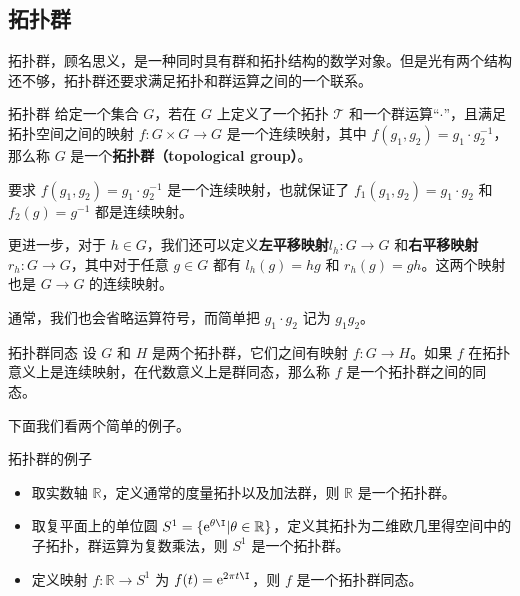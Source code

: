 


\subsection{拓扑群}
拓扑群，顾名思义，是一种同时具有群和拓扑结构的数学对象。但是光有两个结构还不够，拓扑群还要求满足拓扑和群运算之间的一个联系。

\begin{definition}{拓扑群}\label{def_TopGrp_1}
给定一个集合 $G$，若在 $G$ 上定义了一个拓扑 $\mathcal{T}$ 和一个群运算“$\cdot$”，且满足拓扑空间之间的映射 $f:G\times G\rightarrow G$ 是一个连续映射，其中 $f(g_1, g_2)=g_1\cdot g_2^{-1}$，那么称 $G$ 是一个\textbf{拓扑群（topological group）}。
\end{definition}

要求 $f(g_1, g_2)=g_1\cdot g_2^{-1}$ 是一个连续映射，也就保证了 $f_1(g_1, g_2)=g_1\cdot g_2$ 和 $f_2(g)=g^{-1}$ 都是连续映射。

更进一步，对于 $h\in G$，我们还可以定义\textbf{左平移映射}$l_h: G\to G$ 和\textbf{右平移映射}$r_h: G\to G$，其中对于任意 $g\in G$ 都有 $l_h(g)=hg$ 和 $r_h(g)=gh$。这两个映射也是 $G\to G$ 的连续映射。

通常，我们也会省略运算符号，而简单把 $g_1\cdot g_2$ 记为 $g_1g_2$。

\begin{definition}{拓扑群同态}
设 $G$ 和 $H$ 是两个拓扑群，它们之间有映射 $f:G\rightarrow H$。如果 $f$ 在拓扑意义上是连续映射，在代数意义上是群同态，那么称 $f$ 是一个拓扑群之间的同态。
\end{definition}

下面我们看两个简单的例子。

\begin{example}{拓扑群的例子}\label{ex_TopGrp_1}
\begin{itemize}
\item 取实数轴 $\mathbb{R}$，定义通常的度量拓扑以及加法群，则 $\mathbb{R}$ 是一个拓扑群。
\item 取复平面上的单位圆 $S^1=\{\mathrm{e}^{\theta\I}|\theta\in\mathbb{R}\}$，定义其拓扑为二维欧几里得空间中的子拓扑，群运算为复数乘法，则 $S^1$ 是一个拓扑群。
\item 定义映射 $f:\mathbb{R}\rightarrow S^1$ 为 $f(t)=\mathrm{e}^{2\pi t\I}$，则 $f$ 是一个拓扑群同态。
\end{itemize}
\end{example}

